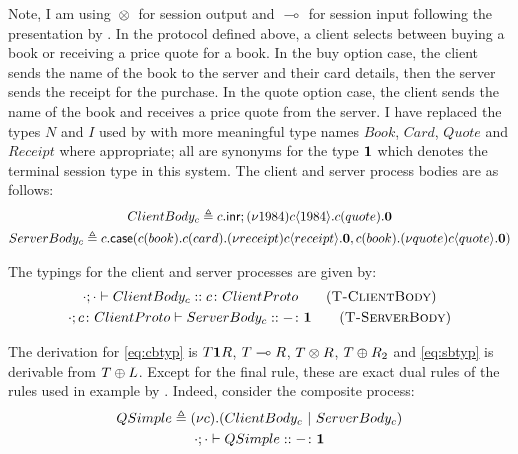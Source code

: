 \documentclass{mpaper}
\begin{document}
Note, I am using ${}\otimes{}$ for session output and ${}\multimap{}$ for session
input following the presentation by \citeauthor{Caires:2010:STI}. In the
protocol defined above, a client selects between buying a book or receiving a
price quote for a book. In the buy option case, the client sends the name of
the book to the server and their card details, then the server sends the
receipt for the purchase. In the quote option case, the client sends the name
of the book and receives a price quote from the server. I have replaced the
types $N$ and $I$ used by \citeauthor{Caires:2010:STI} with more meaningful
type names $Book$, $Card$, $Quote$ and $Receipt$ where appropriate; all are
synonyms for the type $\mathbf{1}$ which denotes the terminal session type in this
system. The client and server process bodies are as follows:
\begin{gather*}
{ClientBody_c}\triangleq{{c}.\mathsf{inr};{(\nu{1984}){c}\langle{1984}\rangle.{{c}({quote}).{\mathbf{0}}}}}\\
{ServerBody_c}\triangleq{{c}.\mathsf{case}({{c}({book}).{{c}({card}).{(\nu{receipt}){c}\langle{receipt}\rangle.{\mathbf{0}}}}},{{c}({book}).{(\nu{quote}){c}\langle{quote}\rangle.{\mathbf{0}}}})}
\end{gather*}

\begin{samepage}
The typings for the client and server processes are given by:
\begin{gather*}
\tsequent{\cdot}{\cdot}{ClientBody_c}{\typedid{c}{ClientProto}}
\tag{\mkTrule{ClientBody}} \label{eq:cbtyp}
\\ \tsequent{\cdot}{\typedid{c}{ClientProto}}{ServerBody_c}{\typedid{-}{\1}}
\tag{\mkTrule{ServerBody}} \label{eq:sbtyp}
\end{gather*}
\end{samepage}

The derivation for \eqref{eq:cbtyp} is $T\mathbf{1} R$, ${T}\multimap{R}$, ${T}\otimes{R}$,
${T}\oplus{R_2}$ and \eqref{eq:sbtyp} is derivable from
${T}\oplus{L}$. Except for the final rule, these are exact dual rules of the
rules used in example by \citeauthor{Caires:2010:STI}. Indeed, consider the
composite process:
\begin{gather*}
{QSimple}\triangleq{(\nu{c}).({ClientBody_c}~|~{ServerBody_c})}\\
{\cdot};{\cdot}\vdash{QSimple}::{{-}\colon{\mathbf{1}}}
\end{gather*}
\end{document}
